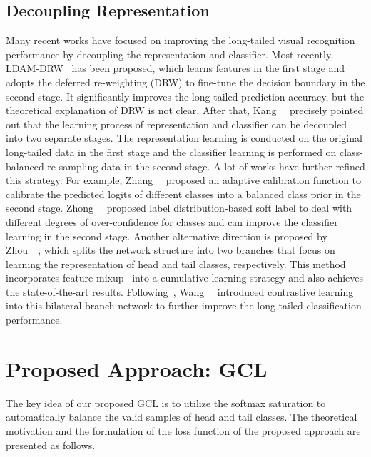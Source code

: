 \documentclass[10pt,twocolumn,letterpaper]{article}
\begin{document}
\subsection{Decoupling Representation }
Many recent works have focused on improving the long-tailed visual recognition performance by decoupling the representation and classifier.
Most recently, LDAM-DRW~\cite{Kaidi2019} has been proposed, which learns features in the first stage and adopts the deferred re-weighting (DRW) to fine-tune the decision boundary in the second stage. It significantly improves the long-tailed prediction accuracy, but the theoretical explanation of DRW is not clear. After that, Kang~\etal~\cite{decouple20} precisely pointed out that the learning process of representation and classifier can be decoupled into two separate stages. The representation learning is conducted on the original long-tailed data in the first stage and the classifier learning is performed on class-balanced re-sampling data in the second stage. A lot of works \cite{wang2020devil, Wang2020Frustratingly, DisAli21, mislas21} have further refined this strategy. For example, Zhang~\etal~\cite{DisAli21} proposed an adaptive calibration function to calibrate the predicted logits of different classes into a balanced class prior in the second stage. Zhong~\etal~\cite{mislas21} proposed label distribution-based soft label to deal with different degrees of over-confidence for classes and can improve the classifier learning in the second stage. Another alternative direction is proposed by Zhou~\etal~\cite{bbn20}, which splits the network structure into two branches that focus on learning the representation of head and tail classes, respectively. This method incorporates feature mixup~\cite{verma2019manifold} into a cumulative learning strategy and also achieves the state-of-the-art results. Following~\cite{bbn20}, Wang~\etal~\cite{contrastive21} introduced contrastive learning into this bilateral-branch network to further improve the long-tailed classification performance.

\section{Proposed Approach: GCL}\label{method}
The key idea of our proposed GCL is to utilize the softmax saturation to automatically balance the valid samples of head and tail classes. The theoretical motivation and the formulation of the loss function of the proposed approach are presented as follows.

\iffalse
\end{document}
